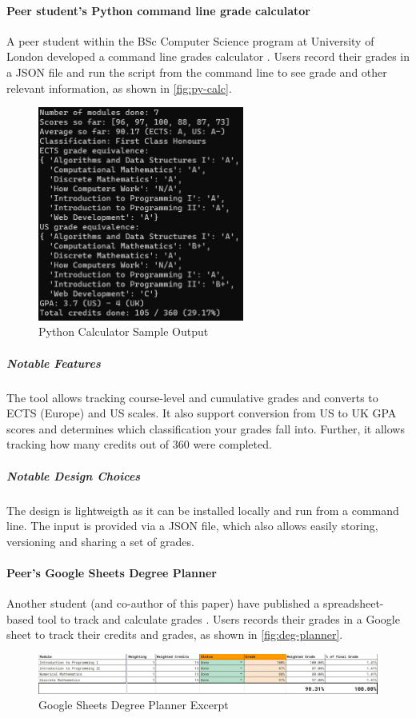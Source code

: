 \paragraph{Peer student's Python command line grade calculator}
A peer student within the BSc Computer Science program at University of London developed a command line grades calculator \cite{lavoie_2020}. Users record their grades in a JSON file and run the script from the command line to see grade and other relevant information, as shown in \autoref{fig:py-calc}.

\begin{figure}[H]
\noindent \includegraphics[height=200pt]{py-example-output.jpg}
\centering
\caption{Python Calculator Sample Output}
\label{fig:py-calc}
\end{figure}

\subparagraph{Notable Features}
The tool allows tracking course-level and cumulative grades and converts to ECTS (Europe) and US scales. It also support conversion from US to UK GPA scores and determines which classification your grades fall into. Further, it allows tracking how many credits out of 360 were completed.

\subparagraph{Notable Design Choices}
The design is lightweigth as it can be installed locally and run from a command line. The input is provided via a JSON file, which also allows easily storing, versioning and sharing a set of grades.

\paragraph{Peer's Google Sheets Degree Planner}
Another student (and co-author of this paper) have published a spreadsheet-based tool to track and calculate grades \cite{muralidharan_2020}. Users records their grades in a Google sheet to track their credits and grades, as shown in \autoref{fig:deg-planner}.
\begin{figure}[H]
\noindent \includegraphics[width=\textwidth]{degree-planner-partial}
\centering
\caption{Google Sheets Degree Planner Excerpt}
\label{fig:deg-planner}
\end{figure}

